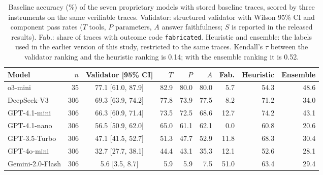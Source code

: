 \begin{table}[!tbp]
\centering
\caption{Baseline accuracy (\%) of the seven proprietary models with stored baseline traces, scored by three instruments on the same verifiable traces. Validator: structured validator with Wilson 95\% CI and component pass rates ($T$ tools, $P$ parameters, $A$ answer faithfulness; $S$ is reported in the released results). Fab.: share of traces with outcome code \texttt{fabricated}. Heuristic and ensemble: the labels used in the earlier version of this study, restricted to the same traces. Kendall's $\tau$ between the validator ranking and the heuristic ranking is 0.14; with the ensemble ranking it is 0.52.}
\label{tab:accuracy}
\footnotesize
\setlength{\tabcolsep}{3.5pt}
\begin{tabular}{@{}lrcrrrrrr@{}}
\toprule
Model & $n$ & Validator [95\% CI] & $T$ & $P$ & $A$ & Fab. & Heuristic & Ensemble \\
\midrule
o3-mini & 35 & 77.1 [61.0, 87.9] & 82.9 & 80.0 & 80.0 & 5.7 & 54.3 & 48.6 \\
DeepSeek-V3 & 306 & 69.3 [63.9, 74.2] & 77.8 & 73.9 & 77.5 & 8.2 & 71.2 & 34.0 \\
GPT-4.1-mini & 306 & 66.3 [60.9, 71.4] & 73.5 & 72.5 & 68.6 & 12.7 & 74.2 & 43.1 \\
GPT-4.1-nano & 306 & 56.5 [50.9, 62.0] & 65.0 & 61.1 & 62.1 & 0.0 & 60.8 & 20.6 \\
GPT-3.5-Turbo & 306 & 47.1 [41.5, 52.7] & 51.3 & 47.7 & 52.9 & 11.8 & 68.3 & 30.4 \\
GPT-4o-mini & 306 & 32.7 [27.7, 38.1] & 44.4 & 43.1 & 35.3 & 12.1 & 52.6 & 28.1 \\
Gemini-2.0-Flash & 306 & 5.6 [3.5, 8.7] & 5.9 & 5.9 & 7.5 & 51.0 & 63.4 & 29.4 \\
\bottomrule
\end{tabular}
\end{table}

